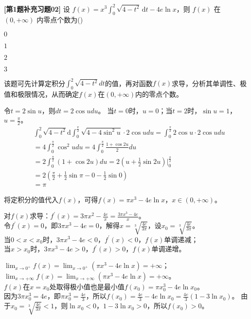 \begin{question}
 \textbf{[第1题补充习题02]}  
 设 $f(x) = x^3 \int_0^2 \sqrt{4 - t^2} \, \mathrm{d}t - 4e \ln x$，则 $f(x)$ 在 $(0, +\infty)$ 内零点个数为(\qquad)
 \begin{choices}
    \item \(0\)
    \item \(1\)
    \item \(2\)
    \item \(3\)
 \end{choices}
\end{question}
\begin{solution}
    该题可先计算定积分\(\int_{0}^{2}\sqrt{4 - t^{2}}dt\)的值，再对函数\(f(x)\)求导，分析其单调性、极值和极限情况，从而确定\(f(x)\)在\((0, +\infty)\)内的零点个数。

    令\(t = 2\sin u\)，则\(dt = 2\cos udu\)。
    当\(t = 0\)时，\(u = 0\)；当\(t = 2\)时，\(\sin u = 1\)，\(u = \frac{\pi}{2}\)。
    \begin{align*}
    & \int_{0}^{2}\sqrt{4 - t^{2}} \mathrm{d}  \int_{0}^{\frac{\pi}{2}}\sqrt{4 - 4\sin^{2}u}\cdot 2\cos udu=\int_{0}^{\frac{\pi}{2}}2\cos u\cdot 2\cos udu\\
    &= 4\int_{0}^{\frac{\pi}{2}}\cos^{2}udu= 4\int_{0}^{\frac{\pi}{2}}\frac{1 + \cos2u}{2}du\\
    &= 2\int_{0}^{\frac{\pi}{2}}(1 + \cos2u)du= 2\left(u + \frac{1}{2}\sin2u\right)\Bigg|_{0}^{\frac{\pi}{2}}\\
    &= 2\left(\frac{\pi}{2} + \frac{1}{2}\sin\pi - 0 - \frac{1}{2}\sin0\right)\\
    &=\pi
    \end{align*}

    将定积分的值代入\(f(x)\)，可得\(f(x)=\pi x^{3}-4e\ln x\)，\(x\in(0, +\infty)\)。

    对\(f(x)\)求导：\(f^\prime(x)=3\pi x^{2}-\frac{4e}{x}=\frac{3\pi x^{3}-4e}{x}\)。\\
    令\(f^\prime(x)=0\)，即\(3\pi x^{3}-4e = 0\)，解得\(x = \sqrt[3]{\frac{4e}{3\pi}}\)，设\(x_0 = \sqrt[3]{\frac{4e}{3\pi}}\)。\\
    当\(0 < x < x_0\)时，\(3\pi x^{3}-4e<0\)，\(f^\prime(x)<0\)，\(f(x)\)单调递减；\\
    当\(x > x_0\)时，\(3\pi x^{3}-4e>0\)，\(f^\prime(x)>0\)，\(f(x)\)单调递增。

    \(\lim_{x \to 0^{+}}f(x)=\lim_{x \to 0^{+}}(\pi x^{3}-4e\ln x)= +\infty\)；\\
    \(\lim_{x \to +\infty}f(x)=\lim_{x \to +\infty}(\pi x^{3}-4e\ln x)= +\infty\)。\\
    \(f(x)\)在\(x = x_0\)处取得极小值也是最小值\(f(x_0)=\pi x_0^{3}-4e\ln x_0\)。\\
    因为\(3\pi x_0^{3}= 4e\)，即\(\pi x_0^{3}=\frac{4e}{3}\)，所以\(f(x_0)=\frac{4e}{3}-4e\ln x_0 = \frac{4e}{3}(1 - 3\ln x_0)\)。
    由于\(x_0 = \sqrt[3]{\frac{4e}{3\pi}}<1\)，则\(\ln x_0<0\)，\(1 - 3\ln x_0>0\)，所以\(f(x_0)>0\)。 


\end{solution}
